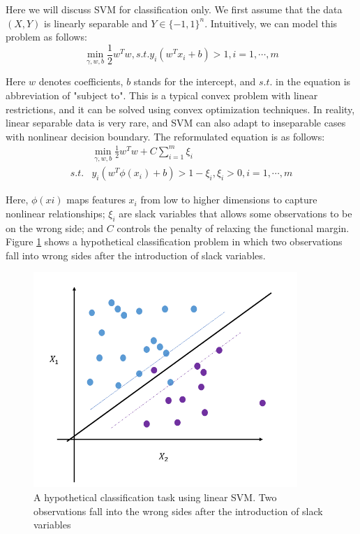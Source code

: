       Here we will discuss SVM for classification only. We first assume that the data $(X, Y)$ is linearly separable and $Y \in \{-1, 1\} ^n$. Intuitively, we can model this problem as follows:
      \begin{equation}
        \min_{\gamma, w, b} \frac{1}{2} w^T w, s.t. y_i (w^T x_i + b) > 1, i = 1, \cdots, m
      \end{equation}
      
      Here $w$ denotes coefficients, $b$ stands for the intercept, and $s.t.$ in the equation is abbreviation of "subject to". This is a typical convex problem with linear restrictions, and it can be solved using convex optimization techniques. In reality, linear separable data is very rare, and SVM can also adapt to inseparable cases with nonlinear decision boundary. The reformulated equation is as follows:
      \begin{equation}
        \begin{split}
          & \min_{\gamma, w, b} \frac{1}{2} w^T w + C \sum_{i=1}^m \xi_i \\
           s.t. & y_i (w^T \phi (x_i) + b) > 1 - \xi_i, \xi_i > 0, i = 1, \cdots, m
        \end{split}
      \end{equation}

      Here, $\phi(xi)$ maps features $x_i$ from low to higher dimensions to capture nonlinear relationships; $\xi_i$ are slack variables that allows some observations to be on the wrong side; and $C$ controls the penalty of relaxing the functional margin. Figure \ref{fig:intr_svm} shows a hypothetical classification problem in which two observations fall into wrong sides after the introduction of slack variables.
      
      \begin{figure}[h]
        \centering
        \includegraphics[width=10cm]{figures/SVM.png}
        \caption{A hypothetical classification task using linear SVM. Two observations fall into the wrong sides after the introduction of slack variables}
        \label{fig:intr_svm}
      \end{figure}

